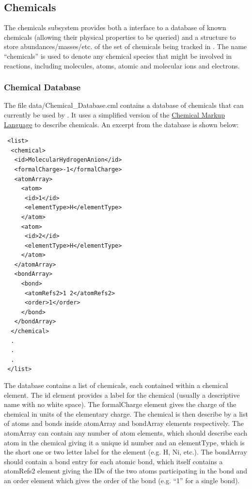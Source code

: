 \subsection{Chemicals}\label{sec:ChemicalSubsystem}

The chemicals subsystem provides both a interface to a database of known chemicals (allowing their physical properties to be queried) and a structure to store abundances/masses/etc. of the set of chemicals being tracked in \glc. The name ``chemicals'' is used to denote any chemical species that might be involved in reactions, including molecules, atoms, atomic and molecular ions and electrons.

\subsubsection{Chemical Database}

The file {\normalfont \ttfamily data/Chemical\_Database.cml} contains a database of chemicals that can currently be used by \glc. It uses a simplified version of the \href{http://www.xml-cml.org}{Chemical Markup Language} to describe chemicals. An excerpt from the database is shown below:
\begin{verbatim}
 <list>
  <chemical>
   <id>MolecularHydrogenAnion</id>
   <formalCharge>-1</formalCharge>
   <atomArray>
     <atom>
      <id>1</id>
      <elementType>H</elementType>
     </atom>
     <atom>
      <id>2</id>
      <elementType>H</elementType>
     </atom>
   </atomArray>
   <bondArray>
     <bond>
      <atomRefs2>1 2</atomRefs2>
      <order>1</order>
     </bond>
   </bondArray>
  </chemical>
  .
  .
  .
 </list>
\end{verbatim}
The database contains a {\normalfont \ttfamily list} of chemicals, each contained within a {\normalfont \ttfamily chemical} element. The {\normalfont \ttfamily id} element provides a label for the chemical (usually a descriptive name with no white space). The {\normalfont \ttfamily formalCharge} element gives the charge of the chemical in units of the elementary charge. The chemical is then describe by a list of atoms and bonds inside {\normalfont \ttfamily atomArray} and {\normalfont \ttfamily bondArray} elements respectively. The {\normalfont \ttfamily atomArray} can contain any number of {\normalfont \ttfamily atom} elements, which should describe each atom in the chemical giving it a unique {\normalfont \ttfamily id} number and an {\normalfont \ttfamily elementType}, which is the short one or two letter label for the element (e.g. H, Ni, etc.). The {\normalfont \ttfamily bondArray} should contain a {\normalfont \ttfamily bond} entry for each atomic bond, which itself contains a {\normalfont \ttfamily atomRefs2} element giving the IDs of the two atoms participating in the bond and an {\normalfont \ttfamily order} element which gives the order of the bond (e.g. ``1'' for a single bond).

